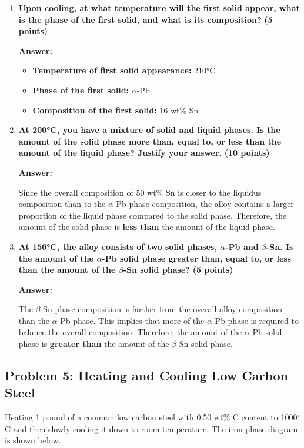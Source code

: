 \documentclass[11pt]{article}
\begin{document}
\begin{enumerate}

\item \textbf{Upon cooling, at what temperature will the first solid appear, what is the phase of the first solid, and what is its composition?} \hfill \textbf{(5 points)}

\textbf{Answer:}

\begin{itemize}
    \item \textbf{Temperature of first solid appearance:} 210°C
    \item \textbf{Phase of the first solid:} $\alpha$-Pb
    \item \textbf{Composition of the first solid:} 16 wt\% Sn
\end{itemize}

\item \textbf{At 200°C, you have a mixture of solid and liquid phases. Is the amount of the solid phase more than, equal to, or less than the amount of the liquid phase? Justify your answer.} \hfill \textbf{(10 points)}

\textbf{Answer:}

Since the overall composition of 50 wt\% Sn is closer to the liquidus composition than to the $\alpha$-Pb phase composition, the alloy contains a larger proportion of the liquid phase compared to the solid phase. Therefore, the amount of the solid phase is \textbf{less than} the amount of the liquid phase.

\item \textbf{At 150°C, the alloy consists of two solid phases, $\alpha$-Pb and $\beta$-Sn. Is the amount of the $\alpha$-Pb solid phase greater than, equal to, or less than the amount of the $\beta$-Sn solid phase?} \hfill \textbf{(5 points)}

\textbf{Answer:}

The $\beta$-Sn phase composition is farther from the overall alloy composition than the $\alpha$-Pb phase. This implies that more of the $\alpha$-Pb phase is required to balance the overall composition. Therefore, the amount of the $\alpha$-Pb solid phase is \textbf{greater than} the amount of the $\beta$-Sn solid phase.

\end{enumerate}


\newpage

\subsection*{Problem 5: Heating and Cooling Low Carbon Steel}
Heating 1 pound of a common low carbon steel with 0.50 wt\% C content to 1000\(^\circ\)C and then slowly cooling it down to room temperature. The iron phase diagram is shown below.
\end{document}
